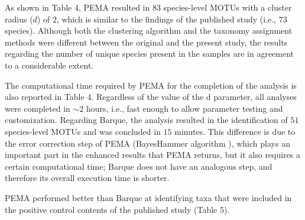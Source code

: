    As shown in Table 4, PEMA resulted in 83 species-level MOTUs with a cluster radius ($d$) of $2$, which is similar to the findings of the published study (i.e., $73$ species). 
   Although both the clustering algorithm and the taxonomy assignment methods were different between the original \citep{bista2017annual} and the present study, the results regarding the number of unique species present in the samples are in agreement to a considerable extent.

   The computational time required by PEMA for the completion of the analysis is also reported in Table 4. 
   Regardless of the value of the d parameter, all analyses were completed in $∼2$ hours, i.e., fast enough to allow parameter testing and customization.
   Regarding Barque, the analysis resulted in the identification of $51$ species-level MOTUs and was concluded in $15$ minutes. 
   This difference is due to the error correction step of PEMA (BayesHammer algorithm \citep{nikolenko2013bayeshammer}), which plays an important part in the enhanced results that PEMA returns, but it also requires a certain computational time; 
   Barque does not have an analogous step, and therefore its overall execution time is shorter.
   
   PEMA performed better than Barque at identifying taxa that were included in the positive control contents of the published study (Table 5).


